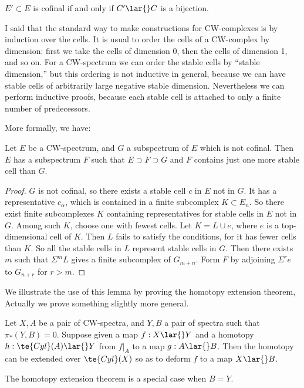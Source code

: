\documentclass[../main]{subfiles}
\begin{document}
\begin{examples}
$E'\subset E$ is cofinal if and only if $C'\lar{} C$ is a bijection.

I said that the standard way to make constructions for CW-complexes is by induction over the cells. It is usual to order the cells of a
CW-complex by dimension: first we take the cells of dimension 0, then
the cells of dimension 1, and so on. For a CW-spectrum we can order
the stable cells by ``stable dimension,'' but this ordering is not inductive
 in general, because we can have stable cells of arbitrarily large negative
stable dimension. Nevertheless we can perform inductive proofs, because each stable cell is attached to only a finite number of predecessors.
\end{examples}More formally, we have:
\begin{lemma}\label{lem:p3ch03.1}
Let $E$ be a CW-spectrum, and $G$ a subspectrum
of $E$ which is not cofinal. Then $E$ has a subspectrum $F$ such that
$E\supset F\supset G$ and $F$ contains just one more stable cell than $G$. 
\end{lemma}
\begin{proof}
$G$ is not cofinal, so there exists a stable cell $c$ in $E$
not in $G$. It has a representative $c_\alpha$, which is contained in a finite subcomplex $K\subset E_n$. So there exist finite subcomplexes $K$ containing representatives for stable cells in $E$ not in $G$. Among such $K$, choose
one with fewest cells. Let $K=L\cup e$, where $e$ is a top-dimensional
cell of $K$. Then $L$ fails to satisfy the conditions, for it has fewer cells
than $K$. So all the stable cells in $L$ represent stable cells in $G$. Then
there exists $m$ such that $\Sigma^mL$ gives a finite subcomplex of $G_{m+n}$.
Form $F$ by adjoining $\Sigma^re$ to $G_{n+r}$ for $r>m$.
\end{proof}
We illustrate the use of this lemma by proving the homotopy extension theorem, Actually we prove something slightly more general. 
\begin{lemma}\label{lem:p3ch03.2}
Let $X,A$ be a pair of CW-spectra, and $Y,B$ a
pair of spectra such that $\pi_\ast(Y,B)= 0$. Suppose given a map $f:X\lar{}Y$
and a homotopy $h: \te{Cyl}(A)\lar{} Y$ from $f|_A$ to a map $g:A\lar{}B$. Then the homotopy can be extended over $\te{Cyl}(X)$ so as to deform $f$ to a map $X\lar{}B$.
\end{lemma}
The homotopy extension theorem is a special case when $B=Y$.
\end{document}
